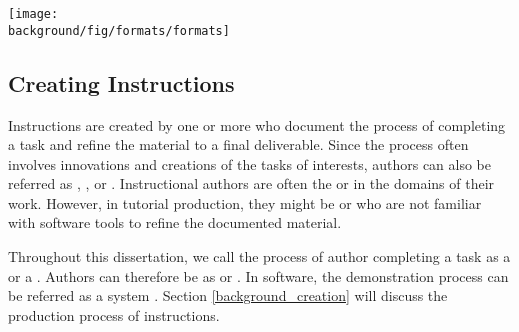 \begin{figure*}[th!]
  \centering
  \begin{minipage}{\textwidth}
  \texttt{[image: \\background/fig/formats/formats]}
  \caption[Major tutorial forms from online resources.]{
    Major tutorial forms from online resources \footnote{Combine photos on the go, \url{https://helpx.adobe.com/mobile-apps/how-to/combine-photos-photoshop-mix.html}} \footnote{Change the color of an object, \url{https://helpx.adobe.com/photoshop/how-to/change-color-object-photoshop.html}}:
    a) Step-by-step static tutorials show a list of steps, each with text and figure(s) that describe a subtask, such as  or , and
    b) video tutorials show an author performing the task, which can be reviewed and controlled via a video player.
    \\
    \copyright2016 with express permission from Adobe Systems Incorporated.
  }
  \label{fig:background_formats}
  \end{minipage}
\end{figure*}


\subsection{Creating Instructions}
Instructions are created by one or more  who document the process of completing a task and refine the material to a final deliverable.
%
Since the process often involves innovations and creations of the tasks of interests, authors can also be referred as , , or .
%
Instructional authors are often the  or  in the domains of their work. However, in tutorial production, they might be  or  who are not familiar with software tools to refine the documented material.

Throughout this dissertation, we call the process of author completing a task as a  or a . Authors can therefore be as  or .
%
In software, the demonstration process can be referred as a system . Section \ref{background_creation} will discuss the production process of instructions.


